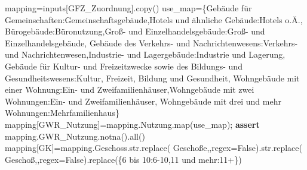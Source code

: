 \documentclass[
  ngerman,
  a4paper,
  DIV=11]{scrreprt}
\newenvironment{Shaded}{\begin{snugshade}}{\end{snugshade}}
\newcommand{\BuiltInTok}[1]{\textcolor[rgb]{0.00,0.23,0.31}{#1}}
\newcommand{\ControlFlowTok}[1]{\textcolor[rgb]{0.00,0.23,0.31}{\textbf{#1}}}
\newcommand{\NormalTok}[1]{\textcolor[rgb]{0.00,0.23,0.31}{#1}}
\newcommand{\OperatorTok}[1]{\textcolor[rgb]{0.37,0.37,0.37}{#1}}
\newcommand{\StringTok}[1]{\textcolor[rgb]{0.13,0.47,0.30}{#1}}
\newcommand{\VariableTok}[1]{\textcolor[rgb]{0.07,0.07,0.07}{#1}}
\begin{document}
\begin{Shaded}
\begin{Highlighting}[]
\NormalTok{mapping}\OperatorTok{=}\NormalTok{inputs[}\StringTok{\textquotesingle{}GFZ\_Zuordnung\textquotesingle{}}\NormalTok{].copy()}
\NormalTok{use\_map}\OperatorTok{=}\NormalTok{\{}\StringTok{\textquotesingle{}Gebäude für Gemeinschaften\textquotesingle{}}\NormalTok{:}\StringTok{\textquotesingle{}Gemeinschaftsgebäude\textquotesingle{}}\NormalTok{,}\StringTok{\textquotesingle{}Hotels und ähnliche Gebäude\textquotesingle{}}\NormalTok{:}\StringTok{\textquotesingle{}Hotels o.Ä.\textquotesingle{}}\NormalTok{,}
 \StringTok{\textquotesingle{}Bürogebäude\textquotesingle{}}\NormalTok{:}\StringTok{\textquotesingle{}Büronutzung\textquotesingle{}}\NormalTok{,}\StringTok{\textquotesingle{}Groß{-} und Einzelhandelsgebäude\textquotesingle{}}\NormalTok{:}\StringTok{\textquotesingle{}Groß{-} und Einzelhandelsgebäude\textquotesingle{}}\NormalTok{,}
 \StringTok{\textquotesingle{}Gebäude des Verkehrs{-} und Nachrichtenwesens\textquotesingle{}}\NormalTok{:}\StringTok{\textquotesingle{}Verkehrs{-} und Nachrichtenwesen\textquotesingle{}}\NormalTok{,}\StringTok{\textquotesingle{}Industrie{-} und Lagergebäude\textquotesingle{}}\NormalTok{:}\StringTok{\textquotesingle{}Industrie und Lagerung\textquotesingle{}}\NormalTok{,}
 \StringTok{\textquotesingle{}Gebäude für Kultur{-} und Freizeitzwecke sowie des Bildungs{-} und Gesundheitswesens\textquotesingle{}}\NormalTok{:}\StringTok{\textquotesingle{}Kultur, Freizeit, Bildung und Gesundheit\textquotesingle{}}\NormalTok{,}
 \StringTok{\textquotesingle{}Wohngebäude mit einer Wohnung\textquotesingle{}}\NormalTok{:}\StringTok{\textquotesingle{}Ein{-} und Zweifamilienhäuser\textquotesingle{}}\NormalTok{,}\StringTok{\textquotesingle{}Wohngebäude mit zwei Wohnungen\textquotesingle{}}\NormalTok{:}\StringTok{\textquotesingle{}Ein{-} und Zweifamilienhäuser\textquotesingle{}}\NormalTok{,}
 \StringTok{\textquotesingle{}Wohngebäude mit drei und mehr Wohnungen\textquotesingle{}}\NormalTok{:}\StringTok{\textquotesingle{}Mehrfamilienhaus\textquotesingle{}}\NormalTok{\}}
\NormalTok{mapping[}\StringTok{\textquotesingle{}GWR\_Nutzung\textquotesingle{}}\NormalTok{]}\OperatorTok{=}\NormalTok{mapping.Nutzung.}\BuiltInTok{map}\NormalTok{(use\_map)}\OperatorTok{;} \ControlFlowTok{assert}\NormalTok{ mapping.GWR\_Nutzung.notna().}\BuiltInTok{all}\NormalTok{()}
\NormalTok{mapping[}\StringTok{\textquotesingle{}GK\textquotesingle{}}\NormalTok{]}\OperatorTok{=}\NormalTok{mapping.Geschoss.}\BuiltInTok{str}\NormalTok{.replace(}\StringTok{\textquotesingle{} Geschoße\textquotesingle{}}\NormalTok{,}\StringTok{\textquotesingle{}\textquotesingle{}}\NormalTok{,regex}\OperatorTok{=}\VariableTok{False}\NormalTok{).}\BuiltInTok{str}\NormalTok{.replace(}\StringTok{\textquotesingle{} Geschoß\textquotesingle{}}\NormalTok{,}\StringTok{\textquotesingle{}\textquotesingle{}}\NormalTok{,regex}\OperatorTok{=}\VariableTok{False}\NormalTok{).replace(\{}\StringTok{\textquotesingle{}6 bis 10\textquotesingle{}}\NormalTok{:}\StringTok{\textquotesingle{}6{-}10\textquotesingle{}}\NormalTok{,}\StringTok{\textquotesingle{}11 und mehr\textquotesingle{}}\NormalTok{:}\StringTok{\textquotesingle{}11+\textquotesingle{}}\NormalTok{\})}

\end{Highlighting}
\end{Shaded}
\end{document}
